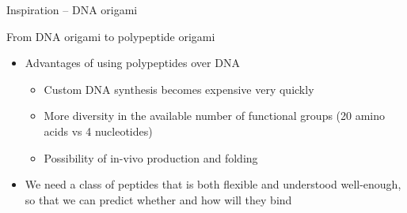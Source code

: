 \documentclass{beamer}
\theoremstyle{plain}
\theoremstyle{remark}
\begin{document}
\begin{frame}{Inspiration -- DNA origami}
\begin{figure}
	\end{figure}
\end{frame}

\begin{frame}{From DNA origami to polypeptide origami}
	\begin{itemize}
		\item Advantages of using polypeptides over DNA
		\begin{itemize}
			\item Custom DNA synthesis becomes expensive very quickly
			\item More diversity in the available number of functional groups (20 amino acids vs 4 nucleotides) \cite{kovcar2015topofold}
			\item Possibility of in-vivo production and folding 
		\end{itemize}
		\item We need a class of peptides that is both flexible and understood well-enough, so that we can predict whether and how will they bind
	\end{itemize}
\end{frame}
\end{document}
